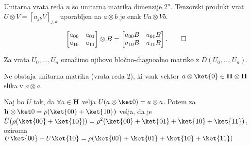 \documentclass[mat1]{fmfdelo}
\newcommand{\p}[1]{\left( {#1} \right)}
\newcommand{\hh}[1][]{\mathbf{h}_{#1}}
\renewcommand{\H}[1][]{\mathbf{H}_{#1}}
\begin{document}
\begin{definicija}%
    Unitarna vrata reda \( n \) so unitarna matrika dimenzije \( 2^n \).
    Tenzorski produkt vrat \( U \otimes V = [u_{jk}V]_{j,k} \) uporabljen na \(a\otimes b\) je enak \( Ua \otimes Vb \).
\end{definicija}
\begin{primer}
    \[
        \begin{bmatrix}
            a_{00} & a_{01} \\ a_{10} & a_{11}
        \end{bmatrix}
        \otimes B
        =
        \begin{bmatrix}
            a_{00} B & a_{01} B \\ a_{10} B & a_{11} B
        \end{bmatrix}\text.\qedhere\]
\end{primer}
\begin{definicija}%
    Za vrata \( U_0,\dots,U_n \) označimo njihovo bločno-diagnoalno matriko z \( D{\p{U_0,\dots,U_n}} \).
\end{definicija}

\begin{izrek}[No cloning]
    Ne obstaja unitarna matrika (vrata reda \(2\)), ki vsak vektor \(a\otimes\ket{0}\in \H\otimes\H\) slika v \(a\otimes a\).
\end{izrek}

\begin{dokaz}
    Naj bo \(U\) tak, da \(\forall a \in \H \) velja \( U{\p{a\otimes\ket0}} = a\otimes a \).
    Potem za \( \hh\otimes\ket0 = \rho(\ket{00} + \ket{10}) \) velja, da je \( U{\p{\rho(\ket{00} + \ket{10})}} = \rho^2(\ket{00} + \ket{01} + \ket{10} + \ket{11}) \), oziroma \(U\ket{00} + U\ket{10} = \rho(\ket{00} + \ket{01} + \ket{10} + \ket{11})\)
\end{dokaz}
\end{document}
